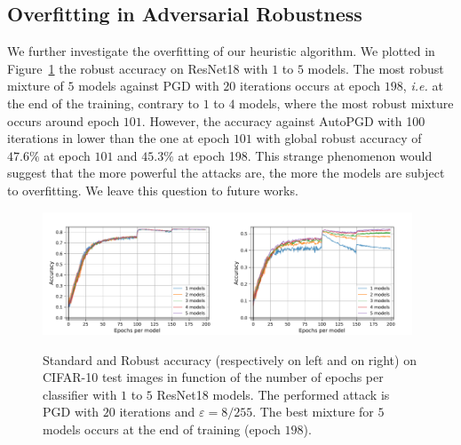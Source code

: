 \subsection{Overfitting in Adversarial Robustness}
We further investigate the overfitting of our heuristic algorithm. We plotted in Figure~\ref{fig:overfitting} the robust accuracy on ResNet18 with $1$ to $5$ models. The most robust mixture of $5$ models against PGD with $20$ iterations occurs at epoch $198$, \emph{i.e.} at the end of the training, contrary to $1$ to $4$ models, where the most robust mixture occurs around epoch $101$. However, the accuracy against AutoPGD with 100 iterations in lower than the one at epoch $101$ with global robust accuracy of $47.6\%$ at epoch $101$ and $45.3\%$ at epoch 198. This strange phenomenon would suggest that the more powerful the attacks are, the more the models are subject to overfitting. We leave this question to future works.


\begin{figure}[!ht]
\begin{center}
\includegraphics[width=0.49\textwidth]{Images/5_standard_acc_finalrun_ResNet18_1024_200_0.001.pdf}\includegraphics[width=0.49\textwidth]{Images/5_robust_acc_finalrun_ResNet18_1024_200_0.001.pdf} 

\caption{Standard and Robust accuracy (respectively on  left and on right) on CIFAR-10 test images in function of the number of epochs per classifier with $1$ to $5$ ResNet18 models. The performed attack is PGD with $20$ iterations and $\varepsilon=8/255$. The best mixture for $5$ models occurs at the end of training (epoch $198$).}
\label{fig:overfitting}
\end{center}
\end{figure}



